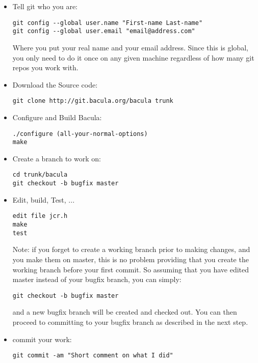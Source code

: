 \begin{itemize}
\item Tell git who you are:\\
\begin{verbatim}
git config --global user.name "First-name Last-name"
git config --global user.email "email@address.com"
\end{verbatim}

Where you put your real name and your email address. Since
this is global, you only need to do it once on any given
machine regardless of how many git repos you work with.

\item Download the Source code:\\
\begin{verbatim}
git clone http://git.bacula.org/bacula trunk
\end{verbatim}

\item Configure and Build Bacula:\\
\begin{verbatim}
./configure (all-your-normal-options)
make
\end{verbatim}

\item Create a branch to work on:
\begin{verbatim}
cd trunk/bacula
git checkout -b bugfix master
\end{verbatim}

\item Edit, build, Test, ...\\
\begin{verbatim}
edit file jcr.h
make
test
\end{verbatim}

Note: if you forget to create a working branch prior to making
changes, and you make them on master, this is no problem providing
that you create the working branch before your first commit.
So assuming that you have edited master instead of your bugfix
branch, you can simply:

\begin{verbatim}
git checkout -b bugfix master
\end{verbatim}

and a new bugfix branch will be created and checked out.
You can then proceed to committing to your bugfix branch as
described in the next step.

\item commit your work:
\begin{verbatim}
git commit -am "Short comment on what I did"
\end{verbatim}


\end{itemize}
